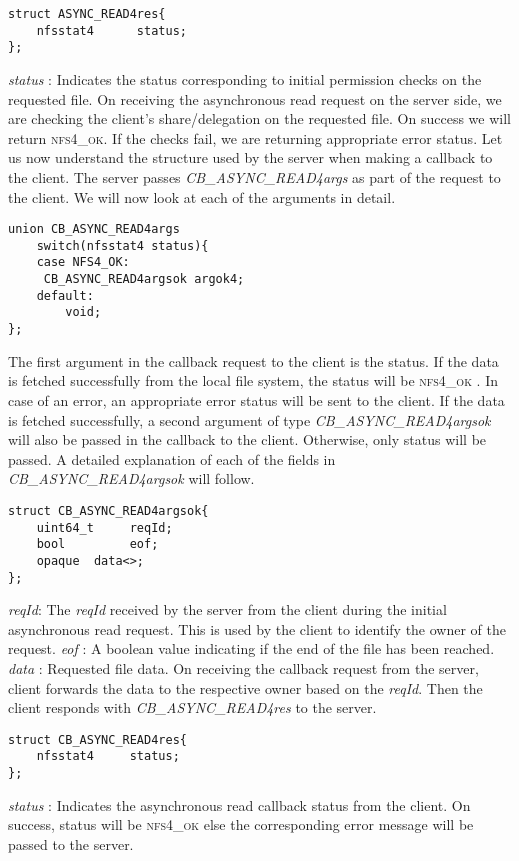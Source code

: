 \begin{lstlisting}
struct ASYNC_READ4res{
	nfsstat4	  status;
};
\end{lstlisting}
\textit{status} : Indicates the status corresponding to initial permission checks on the requested file.
On receiving the asynchronous read request on the server side, we are checking the client's share/delegation on the requested file. On success we will return \textsc{nfs4\_ok}.  If the checks fail, we are returning appropriate error status.
\hfill \break \newline
\noindent Let us now understand the structure used by the server when making a callback to the client. The server passes \textit{CB\_ASYNC\_READ4args} as part of the request to the client. We will now look at each of the arguments in detail. 
\begin{lstlisting}
union CB_ASYNC_READ4args 
	switch(nfsstat4 status){
	case NFS4_OK:
	 CB_ASYNC_READ4argsok argok4;
 	default:
		void;
};
\end{lstlisting}

\noindent The first argument in the callback request to the client is the status. If the data is fetched successfully from the local file system, the status will be \textsc{nfs4\_ok} . In case of an error, an appropriate error status will be sent to the client. If the data is fetched successfully, a second argument of type \textit{CB\_ASYNC\_READ4argsok} will also be passed in the callback to the client. Otherwise, only status will be passed. A detailed explanation of each of the fields in \textit{CB\_ASYNC\_READ4argsok} will follow.

\begin{lstlisting}
struct CB_ASYNC_READ4argsok{
	uint64_t	 reqId;
	bool		 eof;
	opaque	data<>;
};
\end{lstlisting}

\noindent\textit{reqId}: The \textit{reqId} received by the server from the client during the initial asynchronous read request. This is used by the client to identify the owner of the request.
\hfill \break \newline
\noindent\textit{eof} : A boolean value indicating if the end of the file has been reached.
\hfill \break \newline
\noindent\textit{data} : Requested file data.
\hfill \break \newline
\noindent On receiving the callback request from the server, client forwards the data to the respective owner based on the \textit{reqId}. Then the client responds with \textit{CB\_ASYNC\_READ4res} to the server.
 
\begin{lstlisting}
struct CB_ASYNC_READ4res{
	nfsstat4	 status;
};
\end{lstlisting}

\noindent\textit{status} : Indicates the asynchronous read callback status from the client. On success, status will be \textsc{nfs4\_ok} else the corresponding error message will be passed to the server.




